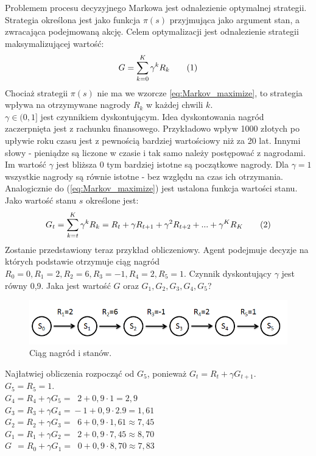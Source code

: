 \documentclass[12pt]{book}
\newcommand\addtag{\refstepcounter{equation}
\renewcommand{\labelenumii}{\theenumii}
\renewcommand{\theenumii}{\theenumi.\arabic{enumii}.}
\tag{\theequation}}
\begin{document}
Problemem procesu decyzyjnego Markowa jest odnalezienie optymalnej strategii. Strategia określona jest jako funkcja $\pi(s)$ przyjmująca jako argument stan, a zwracająca podejmowaną akcję. Celem optymalizacji jest odnalezienie strategii maksymalizującej wartość:
\[
G=\sum_{k=0}^{K} \gamma^k R_{k} \addtag \label{eq:Markov_maximize}
\]
Chociaż strategii $\pi(s)$ nie ma we wzorcze \ref{eq:Markov_maximize}, to strategia wpływa na otrzymywane nagrody $R_{k}$ w każdej chwili $k$.\\
$\gamma \in (0,1]$ jest czynnikiem dyskontującym. Idea dyskontowania nagród zaczerpnięta jest z rachunku finansowego. Przykładowo wpływ 1000 złotych po upływie roku czasu jest z pewnością bardziej wartościowy niż za 20 lat. Innymi słowy - pieniądze są liczone w czasie i tak samo należy postępować z nagrodami. Im wartość $\gamma$ jest bliższa 0 tym bardziej istotne są początkowe nagrody. Dla $\gamma=1$ wszystkie nagrody są równie istotne - bez względu na czas ich otrzymania.\\
Analogicznie do (\ref{eq:Markov_maximize}) jest ustalona funkcja wartości stanu. Jako wartość stanu $s$ określone jest:
\[
G_t=\sum_{k=t}^{K} \gamma^k R_{k}=R_{t}+\gamma R_{t+1}+\gamma^{2} R_{t+2}+...+\gamma^{K}R_K \addtag \label{eq:Markov_state_value_G}
\]
Zostanie przedstawiony teraz przykład obliczeniowy. Agent podejmuje decyzje na których podstawie otrzymuje ciąg  nagród $R_0=0, R_1=2,R_2=6,R_3=-1,R_4=2,R_5=1$. Czynnik dyskontujący $\gamma$ jest równy 0,9. Jaka jest wartość $G$ oraz $G_1,G_2,G_3,G_4,G_5$?\\
\begin{figure}[H]
  \centering
    \includegraphics[width=14cm]{rewards-graph}
 \caption{Ciąg nagród i stanów.}
 \label{fig:agent-srodowisko}
\end{figure}\noindent
Najłatwiej obliczenia rozpocząć od $G_5$, ponieważ
$G_{t}=R_{t}+\gamma G_{t+1}$.\\
$G_5=R_5=1$.\\
$G_4=R_4+\gamma G_{5}=\;\;2+0,9\cdot 1=2,9$\\
$G_3=R_3+\gamma G_{4}=\!-1+0,9\cdot2.9=1,61$\\
$G_2=R_2+\gamma G_{3}=\;\;6+0,9\cdot1,61 \approx 7,45$\\
$G_1=R_1+\gamma G_{2}=\;\;2+0,9\cdot 7,45 \approx 8,70$\\
$G\;\,=R_0+\gamma G_{1}=\;\;0+0,9\cdot 8,70 \approx 7,83$\\
\end{document}
